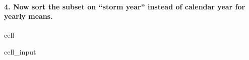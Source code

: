 \documentclass[letterpaper,10pt,english]{jupyterBook}
\begin{document}
\paragraph{4. Now sort the subset on “storm year” instead of calendar year for yearly means.}
\label{\detokenize{notebooks/regional_and_local/SL_anomaly_annual:now-sort-the-subset-on-storm-year-instead-of-calendar-year-for-yearly-means}}
\begin{sphinxuseclass}{cell}\begin{sphinxVerbatimInput}

\begin{sphinxuseclass}{cell_input}
\begin{sphinxVerbatim}[commandchars=\\\{\}]
  

  

\end{sphinxVerbatim}

\end{sphinxuseclass}\end{sphinxVerbatimInput}
\begin{sphinxVerbatimOutput}


\end{sphinxVerbatimOutput}
\end{sphinxuseclass}
\end{document}

